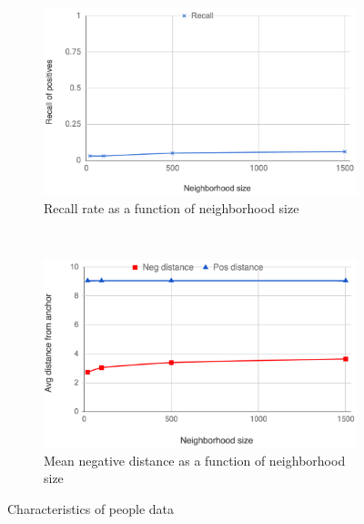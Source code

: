 \begin{figure}[htb]
    \centering
    \begin{subfigure}[t]{0.23\textwidth}
        \centering
        \includegraphics[width=.95\linewidth]{people_recall}
        \caption{Recall rate as a function of neighborhood size}
        \label{people_recall}
    \end{subfigure}%
    ~ 
    \begin{subfigure}[t]{0.23\textwidth}
        \centering 
        \includegraphics[width=.95\linewidth]{people_distances}
        \caption{Mean negative distance as a function of neighborhood size}
        \label{modified_loss}
    \end{subfigure}
    \label{people_distances}
    \caption{Characteristics of people data}
\label{people_characteristics}
\end{figure}


